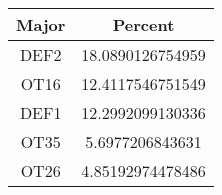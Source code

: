 
\begin{center}
    \begin{tabular}{|c| c|}
        \hline 
        Major & Percent \\
        \hline
        DEF2 & 18.0890126754959 \\
        \hline
        OT16 & 12.4117546751549 \\
        \hline
        DEF1 & 12.2992099130336 \\
        \hline
        OT35 & 5.6977206843631\\
        \hline
        OT26 & 4.85192974478486 \\
        \hline
    \end{tabular}
\end{center}
